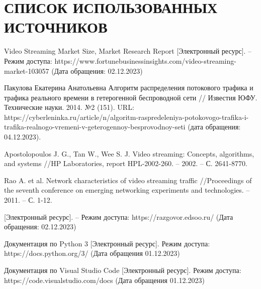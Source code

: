 \section*{СПИСОК ИСПОЛЬЗОВАННЫХ ИСТОЧНИКОВ}

\begingroup
\renewcommand{\section}[2]{}
\begin{thebibliography}{}
	 Video Streaming Market Size, Market Research Report [Электронный ресурс]. -- Режим доступа: https://www.fortunebusinessinsights.com/video-streaming-market-103057 (Дата обращения: 02.12.2023)
	
	 Пакулова Екатерина Анатольевна Алгоритм распределения потокового трафика и трафика реального времени в гетерогенной беспроводной сети // Известия ЮФУ. Технические науки. 2014. №2 (151). URL: https://cyberleninka.ru/article/n/algoritm-raspredeleniya-potokovogo-trafika-i-trafika-realnogo-vremeni-v-geterogennoy-besprovodnoy-seti (дата обращения: 04.12.2023).
	
	 Apostolopoulos J. G., Tan W., Wee S. J. Video streaming: Concepts, algorithms, and systems //HP Laboratories, report HPL-2002-260. – 2002. – С. 2641-8770.
	
	 Rao A. et al. Network characteristics of video streaming traffic //Proceedings of the seventh conference on emerging networking experiments and technologies. – 2011. – С. 1-12.
	
	 [Электронный ресурс]. -- Режим доступа: https://razgovor.edsoo.ru/ (Дата обращения: 02.12.2023)
	
	 Документация по Python 3 [Электронный ресурс]. Режим доступа: https://docs.python.org/3/ (Дата обращения 01.12.2023)
	
	 Документация по Visual Studio Code [Электронный ресурс]. Режим доступа: https://code.visualstudio.com/docs (Дата обращения 01.12.2023)
	
\end{thebibliography}
\endgroup

\pagebreak